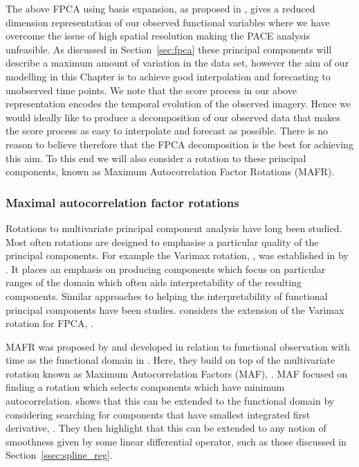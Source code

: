 The above FPCA using basis expansion, as proposed in \citep[Chapter~8]{ramsay_functional_2010}, gives a reduced dimension representation of our observed functional variables where we have overcome the issue of high spatial resolution making the PACE analysis unfeasible.
As discussed in Section~\ref{sec:fpca} these principal components will describe a maximum amount of variation in the data set, however the aim of our modelling in this Chapter is to achieve good interpolation and forecasting to unobserved time points.
We note that the score process in our above representation encodes the temporal evolution of the observed imagery. 
Hence we would ideally like to produce a decomposition of our observed data that makes the score process as easy to interpolate and forecast as possible. 
There is no reason to believe therefore that the FPCA decomposition is the best for achieving this aim.
To this end we will also consider a rotation to these principal components, known as Maximum Autocorrelation Factor Rotations (MAFR).

\subsubsection{Maximal autocorrelation factor rotations \label{ssec:mafr}}
Rotations to multivariate principal component analysis have long been studied.
Most often rotations are designed to emphasise a particular quality of the principal components. 
For example the Varimax rotation, \citep{kaiser_varimax_1958}, was established in \citeyear{kaiser_varimax_1958} by \citeauthor{kaiser_varimax_1958}.
It places an emphasis on producing components which focus on particular ranges of the domain which often aids interpretability of the resulting components.
Similar approaches to helping the interpretability of functional principal components have been studies.
\citeauthor{ramsay_functional_2010} considers the extension of the Varimax rotation for FPCA, \citep{ramsay_functional_2010}. 

MAFR was proposed by \citeauthor{hooker_maximal_2015} and developed in relation to functional observation with time as the functional domain in \citep{hooker_maximal_2016}.
Here, they build on top of the multivariate rotation known as Maximum Autocorrelation Factors (MAF), \citep{switzer_minmax_1984}.
MAF focused on finding a rotation which selects components which have minimum autocorrelation. 
\citeauthor{hooker_maximal_2016} shows that this can be extended to the functional domain by considering searching for components that have smallest integrated first derivative, \citep{hooker_maximal_2016}. 
They then highlight that this can be extended to any notion of smoothness given by some linear differential operator, such as those discussed in Section~\ref{ssec:spline_reg}. 

